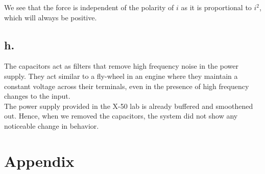 \documentclass{article}
\newcommand{\xxx}[1]{\textcolor{red}{#1}}
\theoremstyle{plain}
\theoremstyle{definition}
\theoremstyle{remark}
\begin{document}
We see that the force is independent of the polarity of $i$ as it is proportional to $i^2$, which will always be positive.


\subsection*{h.}
The capacitors act as filters that remove high frequency noise in the power supply. They act similar to a fly-wheel in an engine where they maintain a constant voltage across their terminals, even in the presence of high frequency changes to the input.\\

The power supply provided in the X-50 lab is already buffered and smoothened out. Hence, when we removed the capacitors, the system did not show any noticeable change in behavior.


%
%
%
\section*{Appendix}
\end{document}
